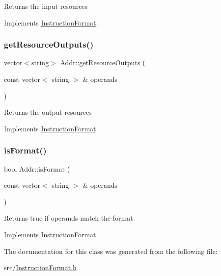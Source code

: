 Returns the input resources 

Implements \hyperlink{classInstructionFormat_a09775d3a3c22f40a0f44504664e586e4}{Instruction\+Format}.

\mbox{\label{classAddr_aa42b861112df7333d93b3dd242e6621b}} 
\subsubsection{\texorpdfstring{get\+Resource\+Outputs()}{getResourceOutputs()}}
{\footnotesize\ttfamily vector$<$string$>$ Addr\+::get\+Resource\+Outputs (\begin{DoxyParamCaption}\item[{const vector$<$ string $>$ \&}]{operands }\end{DoxyParamCaption})\hspace{0.3cm}{\ttfamily [virtual]}}

Returns the output resources 

Implements \hyperlink{classInstructionFormat_a95cd28ffb1bde59b67f676880ab10536}{Instruction\+Format}.

\mbox{\label{classAddr_aff6fd4bf7c93990b1427843fff9069ed}} 
\subsubsection{\texorpdfstring{is\+Format()}{isFormat()}}
{\footnotesize\ttfamily bool Addr\+::is\+Format (\begin{DoxyParamCaption}\item[{const vector$<$ string $>$ \&}]{operands }\end{DoxyParamCaption})\hspace{0.3cm}{\ttfamily [virtual]}}

Returns true if operands match the format 

Implements \hyperlink{classInstructionFormat_a9fdcf94dcd7d9a55ba86e7a63f04d1fe}{Instruction\+Format}.



The documentation for this class was generated from the following file\+:\begin{DoxyCompactItemize}
\item 
src/\hyperlink{InstructionFormat_8h}{Instruction\+Format.\+h}\end{DoxyCompactItemize}
